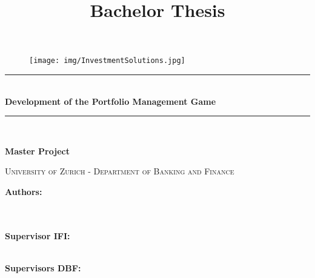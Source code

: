 \documentclass[a4paper,twoside, openright]{scrartcl}
\title{Bachelor Thesis}
\newcommand{\HRule}{\rule{\linewidth}{0.3mm}} %
\begin{document}
\begin{titlepage}
\begingroup
\centering
\vspace*{\baselineskip}

\thispagestyle{empty}

\begin{figure}[H]
	\centering
	\begin{minipage}{.49\textwidth}
		\centering
		\texttt{[image: img/InvestmentSolutions.jpg]}
	\end{minipage}
\end{figure}

\vspace*{1\baselineskip}

\HRule \\[0.4cm]
{\LARGE \textbf{Development of the Portfolio Management Game}}
\HRule \\[1.5cm]

\vspace*{1\baselineskip}

{\large \textbf{Master Project}}

\vspace*{1\baselineskip}

\scshape %
\large University of Zurich - Department of Banking and Finance \\ \vspace{3.5mm}

\vspace*{2\baselineskip}

\textbf{Authors:} \\
 \\
 \\

\vspace*{0.9\baselineskip}

\textbf{Supervisor IFI:} \\
 \\

\vspace*{0.9\baselineskip}

\textbf{Supervisors DBF:} \\
 \\

\endgroup
\end{titlepage}
\end{document}
